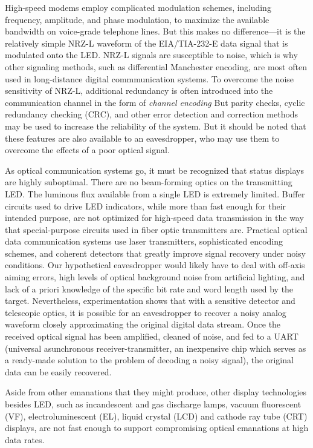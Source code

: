 \documentclass[twocolumn]{article}
\begin{document}
High-speed modems employ complicated modulation schemes, including frequency, amplitude, and phase modulation, to maximize the available bandwidth on voice-grade telephone lines.  But this makes no difference---it is the relatively simple NRZ-L waveform of the EIA/TIA-232-E data signal that is modulated onto the LED.  NRZ-L signals are susceptible to noise, which is why other signaling methods, such as differential Manchester encoding, are most often used in long-distance digital commmunication systems.  To overcome the noise sensitivity of NRZ-L, additional redundancy is often introduced into the communication channel in the form of {\it channel encoding} \cite{proakis}  But parity checks, cyclic redundancy checking (CRC), and other error detection and correction methods may be used to increase the reliability of the system.  But it should be noted that these features are also available to an eavesdropper, who may use them to overcome the effects of a poor optical signal.

As optical communication systems go, it must be recognized that status displays are highly suboptimal.  There are no beam-forming optics on the transmitting LED.  The luminous flux available from a single LED is extremely limited.  Buffer circuits used to drive LED indicators, while more than fast enough for their intended purpose, are not optimized for high-speed data transmission in the way that special-purpose circuits used in fiber optic transmitters are.  Practical optical data communication systems use laser transmitters, sophisticated encoding schemes, and coherent detectors that greatly improve signal recovery under noisy conditions.    Our hypothetical eavesdropper would likely have to deal with off-axis aiming errors, high levels of optical background noise from artificial lighting, and lack of a priori knowledge of the specific bit rate and word length used by the target.  Nevertheless, experimentation shows that with a sensitive detector and telescopic optics, it is possible for an eavesdropper to recover a noisy analog waveform closely approximating the original digital data stream.  Once the received optical signal has been amplified, cleaned of noise, and fed to a UART (universal asunchronous receiver-transmitter, an inexpensive chip which serves as a ready-made solution to the problem of decoding a noisy signal), the original data can be easily recovered.

Aside from other emanations that they might produce, other display technologies besides LED, such as incandescent and gas discharge lamps, vacuum fluorescent (VF), electroluminescent (EL), liquid crystal (LCD) and cathode ray tube (CRT) displays, are not fast enough to support compromising optical emanations at high data rates.
\end{document}
